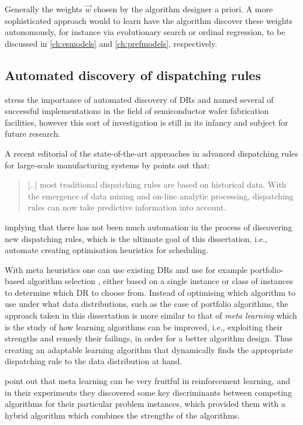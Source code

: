 Generally the weights $\vec{w}$ chosen by the algorithm designer a priori. 
A more sophisticated approach would to learn have the algorithm discover these weights autonomously, for instance via evolutionary search or ordinal regression, to be discussed in \cref{ch:esmodels} and \cref{ch:prefmodels}, respectively.

\subsection{Automated discovery of dispatching rules}
\citet{Monch13} stress the importance of automated discovery of DRs and named several of successful implementations in the field of semiconductor wafer fabrication facilities, however this sort of investigation is still in its infancy and subject for future research.

A recent editorial of the state-of-the-art approaches in advanced dispatching rules for large-scale manufacturing systems by \citet{Chen13} points out that:
\begin{quote}
[..] most traditional dispatching rules are based on historical data. With the emergence of data mining and on-line analytic processing, dispatching rules can now take predictive information into account.
\end{quote}
implying that there has not been much automation in the process of discovering new dispatching rules, which is the ultimate goal of this dissertation, i.e., automate creating optimisation heuristics for scheduling. 

With meta heuristics one can use existing DRs and use for example portfolio-based algorithm selection \citep{Rice76,Gomes01}, either based on a single instance or class of instances \citep{Xu07} to determine which DR to choose from. 
Instead of optimising which algorithm to use under what data distributions, such as the case of portfolio algorithms, the approach taken in this dissertation is more similar to that of \emph{meta learning} \citep{Vilalta02} which is the study of how learning algorithms can be improved, i.e., exploiting their strengths and remedy their failings, in order for a better algorithm design. Thus creating an adaptable learning algorithm that dynamically finds the appropriate dispatching rule  to the data distribution at hand. 

\citet{Kalyanakrishnan11} point out that meta learning can be very fruitful in reinforcement learning, and in their experiments they discovered some key discriminants between competing algorithms for their particular problem instances, which provided them with a hybrid algorithm which combines the strengths of the algorithms.

